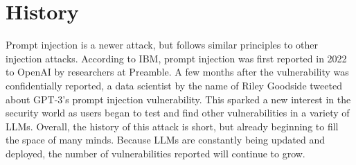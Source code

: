 \documentclass[11pt]{article}
\begin{document}
\section{History}
Prompt injection is a newer attack, but follows similar principles to other injection attacks. According to IBM, prompt injection was first reported in 2022 to OpenAI by researchers at Preamble. A few months after the vulnerability was confidentially reported, a data scientist by the name of Riley Goodside tweeted about GPT-3's prompt injection vulnerability. This sparked a new interest in the security world as users began to test and find other vulnerabilities in a variety of LLMs. Overall, the history of this attack is short, but already beginning to fill the space of many minds. Because LLMs are constantly being updated and deployed, the number of vulnerabilities reported will continue to grow. 
\end{document}
